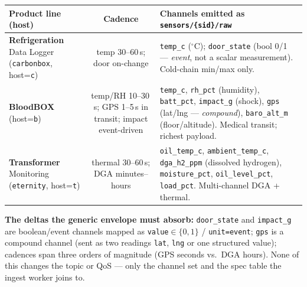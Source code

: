 \documentclass[11pt,a4paper]{article}
\begin{document}
\begin{center}
\renewcommand{\arraystretch}{1.3}
\small
\begin{tabularx}{\textwidth}{@{}p{3.5cm} c X@{}}
\toprule
\textbf{Product line (host)} & \textbf{Cadence} & \textbf{Channels emitted as \texttt{sensors/\{sid\}/raw}} \\
\midrule
\textbf{Refrigeration} \newline Data Logger \newline (\texttt{carbonbox}, host=\texttt{c}) &
  temp 30--60\,s; \newline door on-change &
  \texttt{temp\_c} ($^\circ$C); \texttt{door\_state} (bool 0/1 — \emph{event}, not a scalar
  measurement). Cold-chain min/max only. \\
\addlinespace[2pt]
\textbf{BloodBOX} \newline (host=\texttt{b}) &
  temp/RH 10--30\,s; \newline GPS 1--5\,s in transit; \newline impact event-driven &
  \texttt{temp\_c}, \texttt{rh\_pct} (humidity), \texttt{batt\_pct}, \texttt{impact\_g}
  (shock), \texttt{gps} (lat/lng — \emph{compound}), \texttt{baro\_alt\_m} (floor/altitude).
  Medical transit; richest payload. \\
\addlinespace[2pt]
\textbf{Transformer} \newline Monitoring \newline (\texttt{eternity}, host=\texttt{t}) &
  thermal 30--60\,s; \newline DGA minutes--hours &
  \texttt{oil\_temp\_c}, \texttt{ambient\_temp\_c}, \texttt{dga\_h2\_ppm} (dissolved
  hydrogen), \texttt{moisture\_pct}, \texttt{oil\_level\_pct}, \texttt{load\_pct}.
  Multi-channel DGA + thermal. \\
\bottomrule
\end{tabularx}
\end{center}

\noindent\textbf{The deltas the generic envelope must absorb:} \texttt{door\_state} and
\texttt{impact\_g} are boolean/event channels mapped as \texttt{value}$\in\{0,1\}$ /
\texttt{unit=event}; \texttt{gps} is a compound channel (sent as two readings \texttt{lat},
\texttt{lng} or one structured value); cadences span three orders of magnitude (GPS seconds
vs.\ DGA hours). None of this changes the topic or QoS — only the channel set and the spec
table the ingest worker joins to.
\end{document}
